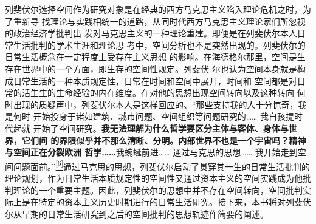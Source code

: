 \documentclass[UTF8, fontset = sourcesans, a4paper, oneside, zihao =
-4, scheme=chinese, no-math, space=true]{ctexbook}
\begin{document}
列斐伏尔选择空间作为研究对象是在经典的西方马克思主义陷入理论危机之时，为了重新寻
找理论与实践相统一的道路，从同时代西方马克思主义理论家们所忽视的政治经济学批判出
发对马克思主义的一种理论重建。即便是在列斐伏尔本人日常生活批判的学术生涯和理论思
考中，空间分析也不是突然出现的。列斐伏尔的日常生活概念在一定程度上受存在主义思想
的影响。在海德格尔那里，空间是生存在世界中的一个方面，即生存的空间性规定。列斐伏
尔也认为空间本身就是构成日常生活的一种本质规定性，日常在时间和空间中展开，时间和
空间都是对日常的活生生的生命经验的内在维度。在对他的思想出现空间转向以及这种转向
何时出现的质疑声中，列斐伏尔本人是这样回应的、``那些支持我的人十分惊奇，我是何时
开始投身于诸如建筑、城市问题、空间组织等问题研究的…… 我自孩提时代起就
开始了空间研究。\textbf{我无法理解为什么哲学要区分主体与客体、身体与世界，它们间
  的界限似乎并不那么清晰、分明。内部世界不也是一个宇宙吗？精神与空间正在分裂欧洲
  哲学……}我蜿蜒前进…… 通过马克思的思想…… 我开始走到空间问题面前。''\protect\hypertarget{part0005_split_001.htmlux5cux23w6}{}{}\protect\hyperlink{part0005_split_003.htmlux5cux23m6}{\textsuperscript{{[}6{]}}}通过马克思的思想，列斐伏尔启动了贯穿其一生的日常生活批判的理论规划，作为日常生活本质规定性的空间性又通过资本主义的空间实践成为他批判理论的一个重要主题。因此，列斐伏尔的思想中并不存在空间转向，空间批判实际上是在特定的资本主义历史时期进行的日常生活研究。接下来，本书将对列斐伏尔从早期的日常生活研究到之后的空间批判的思想轨迹作简要的阐述。
\end{document}

